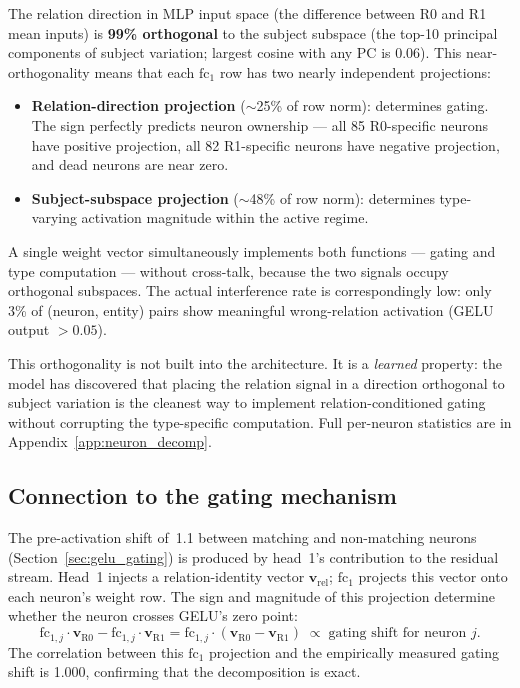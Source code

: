\documentclass[11pt,a4paper]{article}
\newcommand{\bv}{\mathbf{v}}
\newcommand{\fc}{\mathrm{fc}}
\begin{document}
The relation direction in MLP input space (the difference between
R0 and R1 mean inputs) is \textbf{99\% orthogonal} to the subject
subspace (the top-10 principal components of subject variation; largest
cosine with any PC is 0.06). This near-orthogonality means that each
$\fc_1$ row has two nearly independent projections:
\begin{itemize}
\item \textbf{Relation-direction projection} ($\sim$25\% of row
  norm): determines gating. The sign perfectly predicts neuron
  ownership --- all 85 R0-specific neurons have positive projection,
  all 82 R1-specific neurons have negative projection, and dead
  neurons are near zero.
\item \textbf{Subject-subspace projection} ($\sim$48\% of row norm):
  determines type-varying activation magnitude within the active
  regime.
\end{itemize}
A single weight vector simultaneously implements both functions ---
gating and type computation --- without cross-talk, because the two
signals occupy orthogonal subspaces. The actual interference rate is
correspondingly low: only 3\% of (neuron, entity) pairs show
meaningful wrong-relation activation (GELU output $> 0.05$).

This orthogonality is not built into the architecture. It is a
\emph{learned} property: the model has discovered that placing the
relation signal in a direction orthogonal to subject variation is the
cleanest way to implement relation-conditioned gating without
corrupting the type-specific computation. Full per-neuron statistics
are in Appendix~\ref{app:neuron_decomp}.

\subsection{Connection to the gating mechanism}
\label{sec:attn_gating_connection}

The pre-activation shift of~1.1 between matching and non-matching
neurons (Section~\ref{sec:gelu_gating}) is produced by head~1's
contribution to the residual stream. Head~1 injects a
relation-identity vector $\bv_{\text{rel}}$; $\fc_1$ projects this
vector onto each neuron's weight row. The sign and magnitude of this
projection determine whether the neuron crosses GELU's zero point:
\begin{equation}
\fc_{1,j} \cdot \bv_{\text{R0}} - \fc_{1,j} \cdot \bv_{\text{R1}}
  = \fc_{1,j} \cdot (\bv_{\text{R0}} - \bv_{\text{R1}})
  \;\propto\; \text{gating shift for neuron } j.
\label{eq:gating_shift}
\end{equation}
The correlation between this $\fc_1$ projection and the empirically
measured gating shift is 1.000, confirming that the decomposition is
exact.
\end{document}

